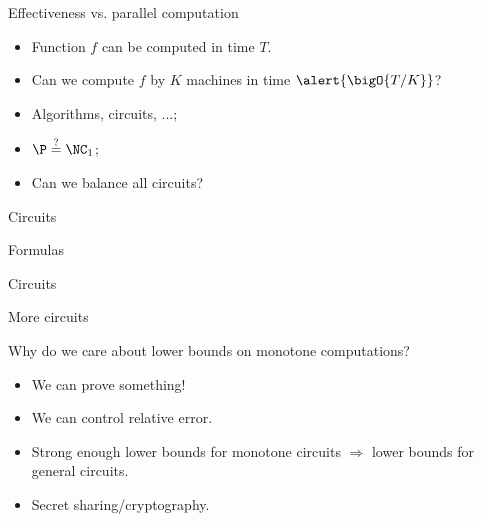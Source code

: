 \begin{frame}{Effectiveness vs. parallel computation}

    \begin{itemize}
        \item Function $f$ can be computed in time $T$.
        \item Can we compute $f$ by $K$ machines in time $\alert{\bigO{T / K}}$?
    \end{itemize}

    \vspace{1cm}
    \pause

    \begin{itemize}
        \item Algorithms, circuits, ...;
            \pause
        \item $\P \stackrel{\tiny ?}{=} \NC_1$;
            \pause
        \item Can we balance all circuits?
    \end{itemize}
\end{frame}


\begin{frame}{Circuits}

        \begin{minipage}{0.33\linewidth}
        \centering
        Formulas
        \vspace{0.2cm}
        
        
    \end{minipage}
    \begin{minipage}{0.33\linewidth}
        \centering
        Circuits
        \vspace{0.2cm}
        
        
    \end{minipage}
    \begin{minipage}{0.32\linewidth}
        \centering
        More circuits
        \vspace{0.2cm}
        
        
    \end{minipage}

    \pause

    \vspace{0.5cm}
    
    Why do we care about lower bounds on monotone computations?
    \begin{itemize}
        \item We can prove something!
            \pause
        \item We can control relative error.
            \pause
        \item Strong enough lower bounds for monotone circuits
            $\Rightarrow$ lower bounds for general circuits.
            \pause
        \item Secret sharing/cryptography.
    \end{itemize}
    
\end{frame}



